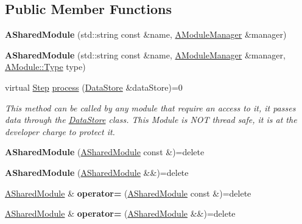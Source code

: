 \subsection*{Public Member Functions}
\begin{DoxyCompactItemize}
\item 
\mbox{\label{classxzia_1_1ASharedModule_a9bf79cf895362f8dad2075927a377311}} 
{\bfseries A\+Shared\+Module} (std\+::string const \&name, \mbox{\hyperlink{classxzia_1_1AModuleManager}{A\+Module\+Manager}} \&manager)
\item 
\mbox{\label{classxzia_1_1ASharedModule_ab663fdca46a4c88594be4bc397e5a978}} 
{\bfseries A\+Shared\+Module} (std\+::string const \&name, \mbox{\hyperlink{classxzia_1_1AModuleManager}{A\+Module\+Manager}} \&manager, \mbox{\hyperlink{classxzia_1_1AModule_a73967be2c863fcfdff0eef4a701df1e0}{A\+Module\+::\+Type}} type)
\item 
virtual \mbox{\hyperlink{Step_8hpp_a58ad1bb906913f90b95697c49f198770}{Step}} \mbox{\hyperlink{classxzia_1_1ASharedModule_ac836fc027900a9c0dfdec35cb034a0a4}{process}} (\mbox{\hyperlink{classxzia_1_1DataStore}{Data\+Store}} \&data\+Store)=0
\begin{DoxyCompactList}\small\item\em This method can be called by any module that require an access to it, it passes data through the \mbox{\hyperlink{classxzia_1_1DataStore}{Data\+Store}} class. This Module is N\+OT thread safe, it is at the developer charge to protect it. \end{DoxyCompactList}\item 
\mbox{\label{classxzia_1_1ASharedModule_a70c816fcf60d56a763d71bbfd9875738}} 
{\bfseries A\+Shared\+Module} (\mbox{\hyperlink{classxzia_1_1ASharedModule}{A\+Shared\+Module}} const \&)=delete
\item 
\mbox{\label{classxzia_1_1ASharedModule_a990ee8fc1f178b160742a1d065ee65e5}} 
{\bfseries A\+Shared\+Module} (\mbox{\hyperlink{classxzia_1_1ASharedModule}{A\+Shared\+Module}} \&\&)=delete
\item 
\mbox{\label{classxzia_1_1ASharedModule_ad928b46779ce21e4d583f8245d736560}} 
\mbox{\hyperlink{classxzia_1_1ASharedModule}{A\+Shared\+Module}} \& {\bfseries operator=} (\mbox{\hyperlink{classxzia_1_1ASharedModule}{A\+Shared\+Module}} const \&)=delete
\item 
\mbox{\label{classxzia_1_1ASharedModule_adc2fc36b022abe037846e3e854707d5b}} 
\mbox{\hyperlink{classxzia_1_1ASharedModule}{A\+Shared\+Module}} \& {\bfseries operator=} (\mbox{\hyperlink{classxzia_1_1ASharedModule}{A\+Shared\+Module}} \&\&)=delete
\end{DoxyCompactItemize}
